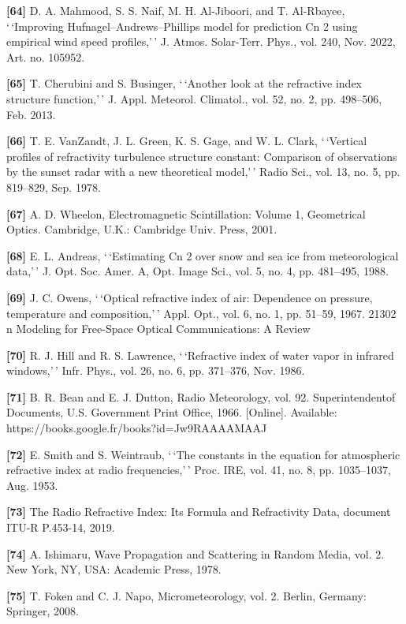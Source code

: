 \documentclass[
]{article}
\begin{document}
\textbf{{[}64{]}} D. A. Mahmood, S. S. Naif, M. H. Al-Jiboori, and T.
Al-Rbayee, `\,`Improving Hufnagel--Andrews--Phillips model for
prediction Cn 2 using empirical wind speed profiles,'\,' J. Atmos.
Solar-Terr. Phys., vol. 240, Nov. 2022, Art. no. 105952.

\textbf{{[}65{]}} T. Cherubini and S. Businger, `\,`Another look at the
refractive index structure function,'\,' J. Appl. Meteorol. Climatol.,
vol. 52, no. 2, pp. 498--506, Feb. 2013.

\textbf{{[}66{]}} T. E. VanZandt, J. L. Green, K. S. Gage, and W. L.
Clark, `\,`Vertical profiles of refractivity turbulence structure
constant: Comparison of observations by the sunset radar with a new
theoretical model,'\,' Radio Sci., vol. 13, no. 5, pp. 819--829, Sep.
1978.

\textbf{{[}67{]}} A. D. Wheelon, Electromagnetic Scintillation: Volume
1, Geometrical Optics. Cambridge, U.K.: Cambridge Univ. Press, 2001.

\textbf{{[}68{]}} E. L. Andreas, `\,`Estimating Cn 2 over snow and sea
ice from meteorological data,'\,' J. Opt. Soc. Amer. A, Opt. Image Sci.,
vol. 5, no. 4, pp. 481--495, 1988.

\textbf{{[}69{]}} J. C. Owens, `\,`Optical refractive index of air:
Dependence on pressure, temperature and composition,'\,' Appl. Opt.,
vol. 6, no. 1, pp. 51--59, 1967. 21302 n Modeling for Free-Space Optical
Communications: A Review

\textbf{{[}70{]}} R. J. Hill and R. S. Lawrence, `\,`Refractive index of
water vapor in infrared windows,'\,' Infr. Phys., vol. 26, no. 6, pp.
371--376, Nov. 1986.

\textbf{{[}71{]}} B. R. Bean and E. J. Dutton, Radio Meteorology, vol.
92. Superintendentof Documents, U.S. Government Print Office, 1966.
{[}Online{]}. Available: https://books.google.fr/books?id=Jw9RAAAAMAAJ

\textbf{{[}72{]}} E. Smith and S. Weintraub, `\,`The constants in the
equation for atmospheric refractive index at radio frequencies,'\,'
Proc. IRE, vol. 41, no. 8, pp. 1035--1037, Aug. 1953.

\textbf{{[}73{]}} The Radio Refractive Index: Its Formula and
Refractivity Data, document ITU-R P.453-14, 2019.

\textbf{{[}74{]}} A. Ishimaru, Wave Propagation and Scattering in Random
Media, vol. 2. New York, NY, USA: Academic Press, 1978.

\textbf{{[}75{]}} T. Foken and C. J. Napo, Micrometeorology, vol. 2.
Berlin, Germany: Springer, 2008.
\end{document}
